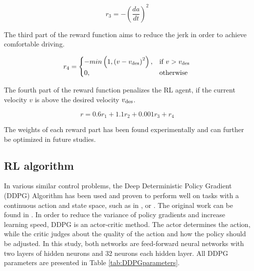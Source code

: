 \documentclass[review]{elsarticle}
\begin{document}
\begin{equation}
r_3 = -\left(\dfrac{da}{dt}\right)^2
\end{equation}

The third part of the reward function aims to reduce the jerk in order to achieve comfortable driving. 

\begin{equation}
r_4 =  
\begin{cases} 
 -min\left(1,\left( v - v_{\rm des}\right)^2\right), & \text{if } v>v_{\rm des}\\
0, & \text{otherwise}
\end{cases}             
\end{equation}

The fourth part of the reward function penalizes the RL agent, if the current velocity $v$ is above the desired velocity $v_{\rm des}$. 

\begin{equation}
r = 0.6r_1 + 1.1r_2 + 0.001 r_3 + r_4
\end{equation}

The weights of each reward part has been found experimentally and can further be optimized in future studies.

\subsection{RL algorithm}
In various similar control problems, the Deep Deterministic Policy Gradient (DDPG) Algorithm has been used and proven to perform well on tasks with a continuous action and state space, such as in \cite{SafeEfficientAndComfortable}, \cite{ComparisonRLvsMPC} or \cite{HumanLikeAutonomouCF}. The original work can be found in \cite{DDPG}. In order to reduce the variance of policy gradients and increase learning speed, DDPG is an actor-critic method. The actor determines the action, while the critic judges about the quality of the action and how the policy should be adjusted. In this study, both networks are feed-forward neural networks with two layers of hidden neurons and 32 neurons each hidden layer. All DDPG parameters are presented in Table \ref{tab:DDPGparameters}.
\end{document}
